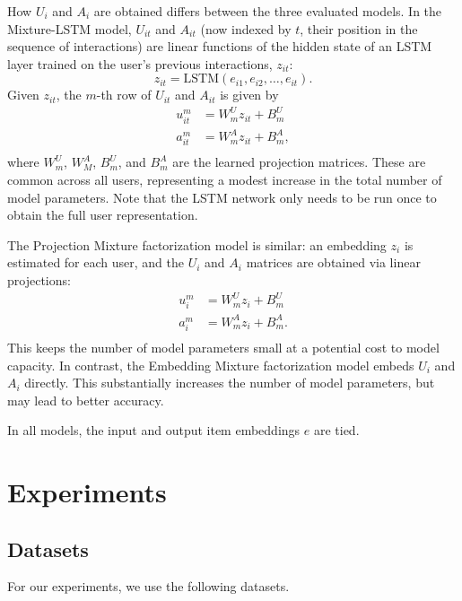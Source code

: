 \documentclass[sigconf]{acmart}
\begin{document}
How $U_i$ and $A_i$ are obtained differs between the three evaluated models. In the Mixture-LSTM model, $U_{it}$ and $A_{it}$ (now indexed by $t$, their position in the sequence of interactions) are linear functions of the hidden state of an LSTM layer trained on the user's previous interactions, $z_{it}$:
\begin{equation}
  z_{it} = \mathrm{LSTM}\left(e_{i1}, e_{i2}, \ldots, e_{it}\right).
\end{equation}
Given $z_{it}$, the $m$-th row of $U_{it}$ and $A_{it}$ is given by
\begin{equation}
\begin{aligned}
  u^m_{it} &= W^U_mz_{it} + B^U_m\\
  a^m_{it} &= W^A_mz_{it} + B^A_m,\\
\end{aligned}
\end{equation}
where $W^U_m$, $W^A_M$, $B^U_m$, and $B^A_m$ are the learned projection matrices. These are common across all users, representing a modest increase in the total number of model parameters. Note that the LSTM network only needs to be run once to obtain the full user representation.

The Projection Mixture factorization model is similar: an embedding $z_i$ is estimated for each user, and the $U_i$ and $A_i$ matrices are obtained via linear projections:
\begin{equation}
\begin{aligned}
  u^m_{i} &= W^U_mz_{i} + B^U_m\\
  a^m_{i} &= W^A_mz_{i} + B^A_m.\\
\end{aligned}
\end{equation}
This keeps the number of model parameters small at a potential cost to model capacity. In contrast, the Embedding Mixture factorization model embeds $U_i$ and $A_i$ directly. This substantially increases the number of model parameters, but may lead to better accuracy.

In all models, the input and output item embeddings $e$ are tied.

\section{Experiments}
\subsection{Datasets}
For our experiments, we use the following datasets.
\end{document}
